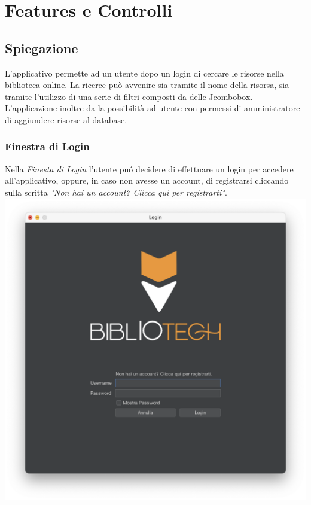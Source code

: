 \chapter{Features e Controlli}
 \section{Spiegazione}
 L'applicativo permette ad un utente dopo un login di cercare le risorse nella biblioteca online.
 La ricerce può avvenire sia tramite il nome della risorsa, sia tramite l'utilizzo di una serie di 
 filtri composti da delle Jcombobox.
 L'applicazione inoltre da la possibilità ad utente con permessi di amministratore di aggiundere risorse 
 al database.


 \subsection{Finestra di Login}
 Nella \textit{Finesta di Login} l'utente pu\'o decidere di effettuare un login per accedere all'applicativo, oppure,
 in caso non avesse un account, di registrarsi cliccando sulla scritta \textit{"Non hai un account? Clicca
 qui per registrarti"}.
 \\
 \includegraphics[scale=0.25, center]{Immagini/Schermate/Login_Register/LoginPage.png}

